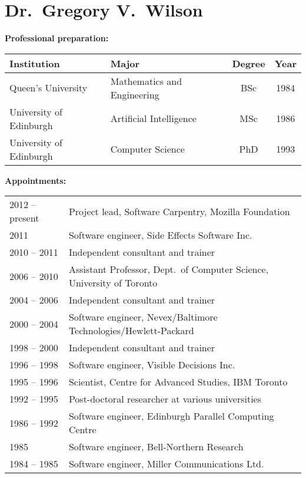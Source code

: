 \documentclass{proposalnsf}
\begin{document}
{}
\renewcommand{\thepage} {\footnotesize Bio.\,---\,\arabic{page}}
\section*{Dr.\ Gregory V.\ Wilson}

\small
\textbf{Professional preparation:} 

\begin{tabular}{llcc}
Institution & Major & Degree & Year \\ \hline
Queen's University & Mathematics and Engineering & BSc & 1984 \\
University of Edinburgh & Artificial Intelligence & MSc & 1986 \\
University of Edinburgh & Computer Science & PhD & 1993 \\
\end{tabular}

\textbf{Appointments:} 

\begin{tabular}{ll}
2012 -- present &  Project lead, Software Carpentry, Mozilla Foundation \\
2011         &  Software engineer, Side Effects Software Inc. \\
2010 -- 2011 &  Independent consultant and trainer \\
2006 -- 2010 &  Assistant Professor, Dept.\ of Computer Science, University of Toronto \\
2004 -- 2006 &  Independent consultant and trainer \\
2000 -- 2004 &  Software engineer, Nevex/Baltimore Technologies/Hewlett-Packard \\
1998 -- 2000 &  Independent consultant and trainer \\
1996 -- 1998 &  Software engineer, Visible Decisions Inc. \\
1995 -- 1996 &  Scientist, Centre for Advanced Studies, IBM Toronto \\
1992 -- 1995 &  Post-doctoral researcher at various universities \\
1986 -- 1992 &  Software engineer, Edinburgh Parallel Computing Centre \\
1985         &  Software engineer, Bell-Northern Research \\
1984 -- 1985 &  Software engineer, Miller Communications Ltd. \\
\end{tabular}
\end{document}
